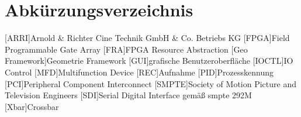 
\chapter{Abk\"urzungsverzeichnis}


\begin{acronym}
	[ARRI]{Arnold \& Richter Cine Technik GmbH \& Co. Betriebs KG}
	[FPGA]{Field Programmable Gate Array}
	[FRA]{FPGA Resource Abstraction}
	[Geo Framework]{Geometrie Framework}
	[GUI]{grafische Benutzeroberfläche}
	[IOCTL]{IO Control}
	[MFD]{Multifunction Device}
	[REC]{Aufnahme}
	[PID]{Prozesskennung}
	[PCI]{Peripheral Component Interconnect}
	[SMPTE]{Society of Motion Picture and Television Engineers}
	[SDI]{Serial Digital Interface} gemäß \ac{smpte} 292M \cite{smpte}
	[Xbar]{Crossbar}
\end{acronym}

